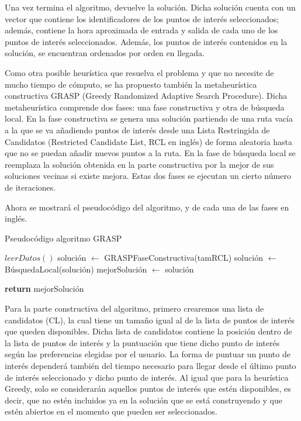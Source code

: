 Una vez termina el algoritmo, devuelve la solución. Dicha solución cuenta con un vector que contiene los identificadores de los puntos de interés seleccionados; además, contiene la hora aproximada de entrada y salida de cada uno de los puntos de interés seleccionados. Además, los puntos de interés contenidos en la solución, se encuentran ordenados por orden en llegada.\newline

Como otra posible heurística que resuelva el problema y que no necesite de mucho tiempo de cómputo, se ha propuesto también la metaheurística constructiva GRASP (Greedy Randomized Adaptive Search Procedure). Dicha metaheurística comprende dos fases: una fase constructiva y otra de búsqueda local. En la fase constructiva se genera una solución partiendo de una ruta vacía a la que se va añadiendo puntos de interés desde una Lista Restringida de Candidatos (Restricted Candidate List, RCL en inglés) de forma aleatoria hasta que no se puedan añadir nuevos puntos a la ruta. En la fase de búsqueda local se reemplaza la solución obtenida en la parte constructiva por la mejor de sus soluciones vecinas si existe mejora. Estas dos fases se ejecutan un cierto número de iteraciones.\newline

Ahora se mostrará el pseudocódigo del algoritmo, y de cada una de las fases en inglés.
\vspace{0.06in}

\begin{algorithm}
	\caption{Pseudocódigo algoritmo GRASP}
	\label{alg:grasp}
\begin{algorithmic}
	\State $ leerDatos() $
		\State solución $ \gets $ GRASPFaseConstructiva(tamRCL)
		\State  solución $\gets$ BúsquedaLocal(solución)
			\State  mejorSolución $\gets$ solución
		\EndIf
	\EndFor
	
	\State \textbf{return} mejorSolución
	\EndFunction
\end{algorithmic}
\end{algorithm}

\vspace{0.06in}
Para la parte constructiva del algoritmo, primero crearemos una lista de candidatos (CL), la cual tiene un tamaño igual al de la lista de puntos de interés que queden disponibles. Dicha lista de candidatos contiene la posición dentro de la lista de puntos de interés y la puntuación que tiene dicho punto de interés según las preferencias elegidas por el usuario. La forma de puntuar un punto de interés dependerá también del tiempo necesario para llegar desde el último punto de interés seleccionado y dicho punto de interés. Al igual que para la heurística Greedy, solo se considerarán aquellos puntos de interés que estén disponibles, es decir, que no estén incluidos ya en la solución que se está construyendo y que estén abiertos en el momento que pueden ser seleccionados.\newline

